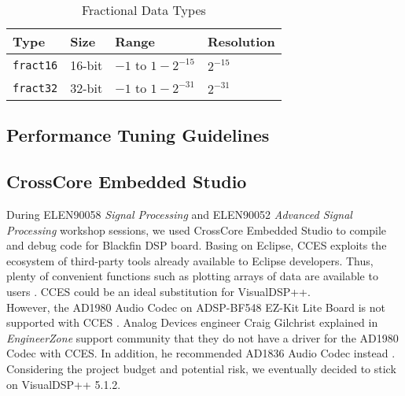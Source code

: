 \begin{table}[H]
\centering
\begin{tabu} to \textwidth {XXXX}
\toprule
Type &Size &Range &Resolution\\
\hline
\texttt{fract16} &16-bit &$-1$ to $1 - 2^{-15}$ &$2^{-15}$\\
\hline
\texttt{fract32} &32-bit &$-1$ to $1 - 2^{-31}$ &$2^{-31}$\\
\bottomrule
\end{tabu}
\caption{Fractional Data Types}
\label{fractional-data-types}
\end{table}


\subsection{Performance Tuning Guidelines}


\subsection{CrossCore Embedded Studio}

During ELEN90058 \textit{Signal Processing} and ELEN90052 \textit{Advanced Signal Processing} workshop sessions, we used CrossCore\textsuperscript{\textregistered} Embedded Studio to compile and debug code for Blackfin DSP board. Basing on Eclipse, CCES exploits the ecosystem of third-party tools already available to Eclipse developers. Thus, plenty of convenient functions such as plotting arrays of data are available to users \cite{erik-cces}\cite{cces-faq}. CCES could be an ideal substitution for VisualDSP++.\\

However, the AD1980 Audio Codec on ADSP-BF548 EZ-Kit Lite Board is not supported with CCES \cite{cces-ad1980}. Analog Devices engineer Craig Gilchrist explained in \textit{EngineerZone} support community that they do not have a driver for the AD1980 Codec with CCES. In addition, he recommended AD1836 Audio Codec instead \cite{BF548-BSP}.\\

Considering the project budget and potential risk, we eventually decided to stick on VisualDSP++ 5.1.2.


